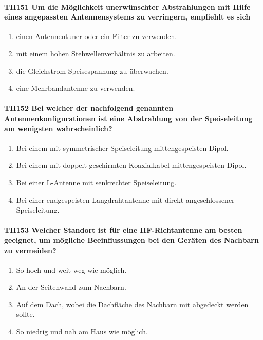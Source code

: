 \documentclass[8pt]{article}
\begin{document}
\paragraph*{TH151 Um die Möglichkeit unerwünschter Abstrahlungen mit Hilfe eines angepassten Antennensystems zu verringern, empfiehlt es sich} 
\begin{enumerate}[nolistsep,label=\Alph*]
\item einen Antennentuner oder ein Filter zu verwenden.
\item mit einem hohen Stehwellenverhältnis zu arbeiten.
\item die Gleichstrom-Speisespannung zu überwachen.
\item eine Mehrbandantenne zu verwenden.
\end{enumerate}

\paragraph*{TH152 Bei welcher der nachfolgend genannten Antennenkonfigurationen ist eine Abstrahlung von der Speiseleitung am wenigsten wahrscheinlich?}
\begin{enumerate}[nolistsep,label=\Alph*]
\item Bei einem mit symmetrischer Speiseleitung mittengespeisten Dipol. 
\item Bei einem mit doppelt geschirmten Koaxialkabel mittengespeisten Dipol.
\item Bei einer L-Antenne mit senkrechter Speiseleitung. 
\item Bei einer endgespeisten Langdrahtantenne mit direkt angeschlossener Speiseleitung.
\end{enumerate}

\paragraph*{TH153 Welcher Standort ist für eine HF-Richtantenne am besten geeignet, um mögliche Beeinflussungen bei den Geräten des Nachbarn zu vermeiden?}
\begin{enumerate}[nolistsep,label=\Alph*]
\item So hoch und weit weg wie möglich.
\item An der Seitenwand zum Nachbarn.
\item Auf dem Dach, wobei die Dachfläche des Nachbarn mit abgedeckt werden sollte.
\item So niedrig und nah am Haus wie möglich.
\end{enumerate}
\end{document}
